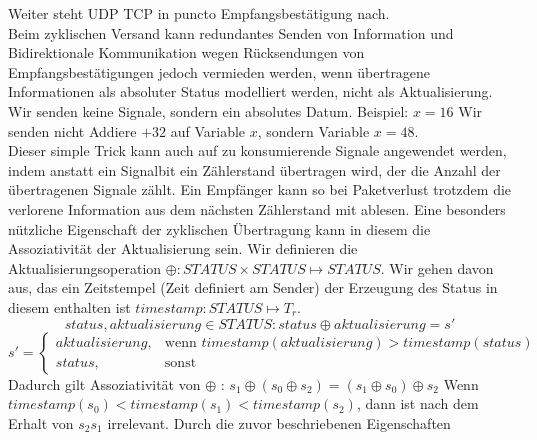 Weiter steht UDP TCP in puncto Empfangsbestätigung nach.\\
Beim zyklischen Versand kann redundantes Senden von Information und Bidirektionale Kommunikation wegen Rücksendungen von Empfangsbestätigungen jedoch vermieden werden, wenn übertragene Informationen als absoluter Status modelliert werden, nicht als Aktualisierung. Wir senden keine Signale, sondern ein absolutes Datum. Beispiel: 
$x = 16$ Wir senden nicht \glqq Addiere $+32$ auf Variable $x$\grqq , sondern \glqq Variable $x = 48$\grqq .\\
Dieser simple Trick kann auch auf zu konsumierende Signale angewendet werden, indem anstatt ein Signalbit ein Zählerstand übertragen wird, der die Anzahl der übertragenen Signale zählt. Ein Empfänger kann so bei Paketverlust trotzdem die verlorene Information aus dem nächsten Zählerstand mit ablesen.
Eine besonders nützliche Eigenschaft der zyklischen Übertragung kann in diesem die Assoziativität der Aktualisierung sein. Wir definieren die Aktualisierungsoperation $\oplus : STATUS \times STATUS \mapsto STATUS$. Wir gehen davon aus, das ein Zeitstempel (Zeit definiert am Sender) der Erzeugung des Status in diesem enthalten ist $timestamp: STATUS \mapsto T_r$.
$$ status, aktualisierung \in STATUS : status \oplus aktualisierung = s' $$
$$
s' =
\begin{cases}
	aktualisierung,& \text{wenn } timestamp(aktualisierung) > timestamp(status)\\
    status,              & \text{sonst}
\end{cases}
 $$
 Dadurch gilt Assoziativität von $\oplus$ : $ s_1 \oplus (s_0 \oplus s_2) = (s_1 \oplus s_0) \oplus s_2 $
 Wenn $timestamp(s_0) < timestamp(s_1) < timestamp(s_2)$, dann ist nach dem Erhalt von $s_2 s_1$ irrelevant. Durch die zuvor beschriebenen Eigenschaften 
